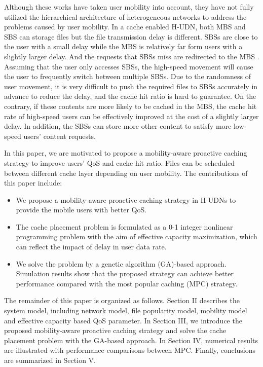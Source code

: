 \documentclass[conference]{IEEEtran}
\begin{document}
Although these works have taken user mobility into account, they have not fully utilized the hierarchical architecture of heterogeneous networks to address the problems caused by user mobility. In a cache enabled H-UDN, both MBS and SBS can storage files but the file transmission delay is different. SBSs are close to the user with a small delay while the MBS is relatively far form users with a slightly larger delay. And the requests that SBSs miss are redirected to the MBS \cite{7484297}. Assuming that the user only accesses SBSs, the high-speed movement will cause the user to frequently switch between multiple SBSs. Due to the randomness of user movement, it is very difficult to push the required files to SBSs accurately in advance to reduce the delay, and the cache hit ratio is hard to guarantee. On the contrary, if these contents are more likely to be cached in the MBS, the cache hit rate of high-speed users can be effectively improved at the cost of a slightly larger delay. In addition, the SBSs can store more other content to satisfy more low-speed users' content requests.

In this paper, we are motivated to propose a mobility-aware proactive caching strategy to improve users’ QoS and cache hit ratio. Files can be scheduled between different cache layer depending on user mobility. The contributions of this paper include:

\begin{itemize}
 \item We propose a mobility-aware proactive caching strategy in H-UDNs to provide the mobile users with better QoS.
 \item The cache placement problem is formulated as a 0-1 integer nonlinear programming problem with the aim of effective capacity maximization, which can reflect the impact of delay in user data rate.
 \item We solve the problem by a genetic algorithm (GA)-based approach. Simulation results show that the proposed strategy can achieve better performance compared with the most popular caching (MPC) strategy.
\end{itemize}

The remainder of this paper is organized as follows. Section II describes the system model, including network model, file popularity model, mobility model and effective capacity based QoS parameter. In Section III, we introduce the proposed mobility-aware proactive caching strategy and solve the cache placement problem with the GA-based approach. In Section IV, numerical results are illustrated with performance comparisons between MPC. Finally, conclusions are summarized in Section V.
\end{document}
